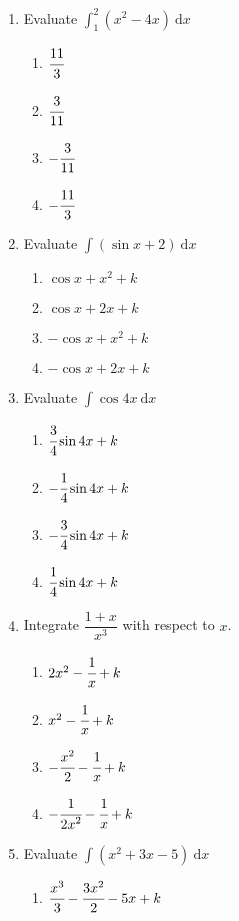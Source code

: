 \begin{multicols}{2}
\begin{enumerate}[label={\arabic*.}]
    \item Evaluate \(\displaystyle \int_{1}^{2} \left({x}^{2}-4x\right)\ \mathrm{d}x\)
      \begin{enumerate}[label={\Alph*.}]
        \item \(\cfrac{11}{3}\)
        \item \(\cfrac{3}{11}\)
        \item \(-{\cfrac{3}{11}}\)
        \item \(-{\cfrac{11}{3}}\)
      \end{enumerate}
    \item Evaluate \(\displaystyle \int \left(\sin{x}+2\right)\ \mathrm{d}x\)
      \begin{enumerate}[label={\Alph*.}]
        \item \(\cos{x} + {x}^{2} + k\)
        \item \(\cos{x} + 2x + k\)
        \item \(-{\cos{x}} + {x}^{2} + k\)
        \item \(-{\cos{x}} + 2x + k\)
      \end{enumerate}
    \item Evaluate \(\displaystyle \int \cos{4x}\ \mathrm{d}x\)
      \begin{enumerate}[label={\Alph*.}]
        \item \(\cfrac{3}{4}\sin{4x} + k\)
        \item \(-{\cfrac{1}{4}\sin{4x}} + k\)
        \item \(-{\cfrac{3}{4}\sin{4x}} + k\)
        \item \({\cfrac{1}{4}\sin{4x}} + k\)
      \end{enumerate}
    \item Integrate \(\dfrac{1+x}{{x}^{3}}\) with respect to \(x\).
      \begin{enumerate}[label={\Alph*.}]
        \item \(2{x}^{2} -\cfrac{1}{x} + k \)
        \item \({x}^{2} -\cfrac{1}{x} + k \)
        \item \(-{\cfrac{{x}^{2}}{2}} -\cfrac{1}{x} + k \)
        \item \(-{\cfrac{1}{{2x}^{2}}} -\cfrac{1}{x} + k \)
      \end{enumerate}
    \item Evaluate \(\displaystyle \int \left({x}^{2}+3x-5\right)\ \mathrm{d}x\)
      \begin{enumerate}[label={\Alph*.}]
        \item \({\cfrac{{x}^{3}}{3}} - {\cfrac{3{x}^{2}}{2}} - 5x + k \)

\end{enumerate}
\end{enumerate}
\end{multicols}
